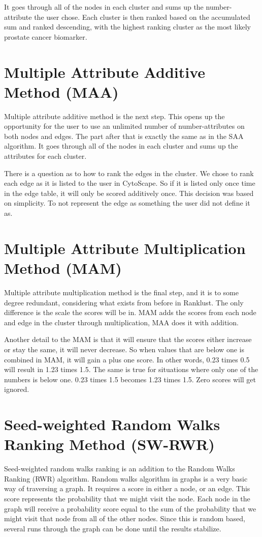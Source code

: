 It goes through all of the nodes in each cluster and sums up the number-
attribute the user chose. Each cluster is then ranked based on the accumulated
sum and ranked descending, with the highest ranking cluster as the most likely
prostate cancer biomarker.

\section{Multiple Attribute Additive Method (MAA)}
Multiple attribute additive method is the next step. This opens up the
opportunity for the user to use an unlimited number of number-attributes on both
nodes and edges. The part after that is exactly the same as in the SAA
algorithm. It goes through all of the nodes in each cluster and sums up the
attributes for each cluster.

There is a question as to how to rank the edges in the cluster. We chose to rank
each edge as it is listed to the user in CytoScape. So if it is listed only once
time in the edge table, it will only be scored additively once. This decision
was based on simplicity. To not represent the edge as something the user did not
define it as.

\section{Multiple Attribute Multiplication Method (MAM)}
Multiple attribute multiplication method is the final step, and it is to some
degree redundant, considering what exists from before in Ranklust. The only
difference is the scale the scores will be in. MAM adds the scores from each
node and edge in the cluster through multiplication, MAA does it with addition. 

Another detail to the MAM is that it will ensure that the scores either increase
or stay the same, it will never decrease. So when values that are below one is
combined in MAM, it will gain a plus one score. In other words, 0.23 times %
0.5 will result in 1.23 times 1.5. The same is true for situations where only
one of the numbers is below one. 0.23 times 1.5 becomes 1.23 times 1.5. Zero
scores will get ignored.

\section{Seed-weighted Random Walks Ranking Method (SW-RWR)}
Seed-weighted random walks ranking \cite{sw-rwr} is an addition to the Random Walks Ranking
(RWR) algorithm. Random walks algorithm in graphs is a very basic way of
traversing a graph. It requires a score in either a node, or an edge.  This
score represents the probability that we might visit the node. Each node in the
graph will receive a probability score equal to the sum of the probability that
we might visit that node from all of the other nodes. Since this is random
based, several runs through the graph can be done until the results stabilize.

